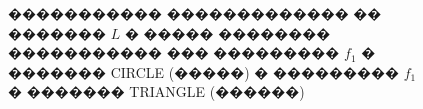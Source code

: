 \documentclass[a4paper]{article}
\begin{document}
\begin{figure}[!h]
\begin{minipage}[h]{0.49\linewidth}
  \end{minipage}
  \caption{����������� ������������� �� ������� $L$ � ����� �������� ����������� ��� ��������� $f_1$ � ������� CIRCLE (�����) �  ��������� $f_1$ � ������� TRIANGLE (������)}
  \label{r1}
\end{figure}
\end{document}
